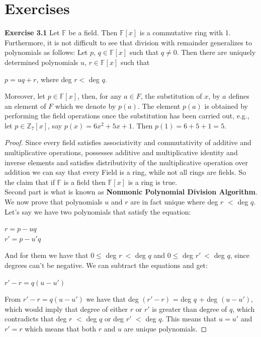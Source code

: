 \documentclass[a4paper]{article}
\begin{document}
\section{Exercises}
\noindent \textbf{Exercise 3.1} Let $\mathbb{F}$ be a field. Then $\mathbb{F}[x]$ is a commutative ring with 1. Furthermore, it is not difficult to see that division with remainder generalizes to polynomials as follows: Let $p$, $q \in \mathbb{F}[x]$ such that $q \neq0$. Then there are uniquely determined polynomials $u$, $r \in \mathbb{F}[x]$ such that
\begin{center}
$p = uq + r$, where deg $r<$ deg $q$.	
\end{center}
Moreover, let $p \in \mathbb{F}[x]$, then, for any $a \in F$, the substitution of $x$, by $a$ defines an element of $F$ which we denote by $p(a)$. The element $p(a)$ is obtained by performing the field operations once the substitution has been carried out, e.g., let $p \in \mathbb{Z}_{7}[x]$, say $p(x) = 6x^{2} + 5x + 1$. Then $p(1) = 6 + 5 + 1 = 5$.
\begin{proof}
Since every field satisfies associativity and commutativity of additive and multiplicative operations, possesses additive and multiplicative identity and inverse elements and satisfies distributivity of the multiplicative operation over addition we can say that every Field is a ring, while not all rings are fields. So the claim that if $\mathbb{F}$ is a field then $\mathbb{F}[x]$ is a ring is true.\\
Second part is what is known as \textbf{Nonmonic Polynomial Division Algorithm}. We now prove that polynomials $u$ and $r$ are in fact unique where deg $r$ $<$ deg $q$.\\
Let's say we have two polynomials that satisfy the equation:
\begin{center}
$r = p - uq$\\
$r' = p - u'q$	
\end{center}
And for them we have that $0 \leq $ deg $r\ <$ deg $q$ and $0 \leq $ deg $r'\ <$ deg $q$, since degrees can't be negative. We can subtract the equations and get:
\begin{center}
$r' - r	= q(u - u')$
\end{center}
From $r' - r	= q(u - u')$ we have that deg $(r' - r)$ = deg $q$ + deg $(u - u')$, which would imply that degree of either $r$ or $r'$ is greater than degree of $q$, which contradicts that deg $r$ $<$ deg $q$ or deg $r'$ $<$ deg $q$. This means that $u=u'$ and $r'=r$ which means that both $r$ and $u$ are unique polynomials.

\end{proof}
\end{document}
